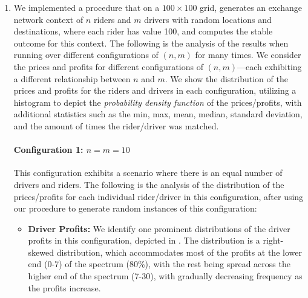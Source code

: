 \documentclass{article}
\begin{document}
\begin{enumerate}[label=(\alph*)]
    We observe that driver profits increase---which is expected given that the demand outgrew the supply, which thus heightened the competitive overbidding nature among the riders, amplified by the stability property of the outcome. Rider prices also increase, which is expected as the riders are competing with each other to provide the highest price to the drivers, and thus higher prices have increasing frequency.

    Yet again, we see that riders positioned closer to the center of the grid can extract more value from the drivers, as their average distance from all drivers is lower (where their distance from their destination remains the same), which heightens competition between drivers for the rider, and thus the rider can extract lower prices. Similarly, drivers positioned closer to the center of the grid can extract more value from the riders, as their average distance from all riders is lower, which heightens competition between riders for the driver, and thus the driver can extract higher profits.

    \item We implemented a procedure that on a $100 \times 100$ grid, generates an exchange network context of $n$ riders and $m$ drivers with random locations and destinations, where each rider has value 100, and computes the stable outcome for this context. The following is the analysis of the results when running over different configurations of $(n, m)$ for many times. We consider the prices and profits for different configurations of $(n, m)$---each exhibiting a different relationship between $n$ and $m$. We show the distribution of the prices and profits for the riders and drivers in each configuration, utilizing a histogram to depict the \textit{probability density function} of the prices/profits, with additional statistics such as the min, max, mean, median, standard deviation, and the amount of times the rider/driver was matched.
    
    \paragraph{Configuration 1: $n = m = 10$}
    This configuration exhibits a scenario where there is an equal number of drivers and riders. The following is the analysis of the distribution of the prices/profits for each individual rider/driver in this configuration, after using our procedure to generate random instances of this configuration:

    \begin{itemize}
        \item \textbf{Driver Profits:} We identify one prominent distributions of the driver profits in this configuration, depicted in . The distribution is a right-skewed distribution, which accommodates most of the profits at the lower end (0-7) of the spectrum (80\%), with the rest being spread across the higher end of the spectrum (7-30), with gradually decreasing frequency as the profits increase.
        

\end{itemize}
\end{enumerate}
\end{document}
